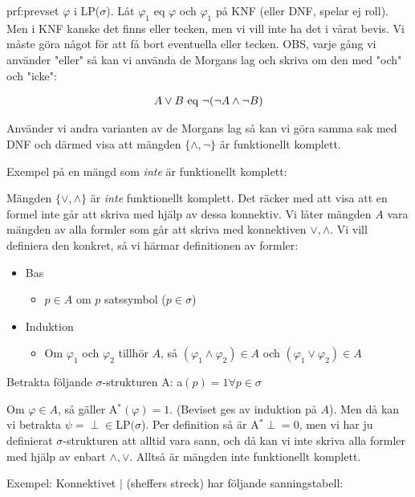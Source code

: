 \begin{prf}{prf:prevset}
  $\varphi$ i LP($\sigma$). Låt $\varphi_1$ eq $\varphi$ och $\varphi_1$ på KNF (eller DNF, spelar ej roll). Men i KNF kanske det finns eller tecken, men vi vill inte ha det i vårat bevis. Vi måste göra något för att få bort eventuella eller tecken. OBS, varje gång vi använder "eller" så kan vi använda de Morgans lag och skriva om den med "och" och "icke":
  \par

  \begin{equation*}
    \begin{gathered}
      A\vee B$ eq $\neg(\neg A\wedge\neg B)
    \end{gathered}
  \end{equation*}\par
  \noindent Använder vi andra varianten av de Morgans lag så kan vi göra samma sak med DNF och därmed visa att mängden $\{\wedge,\neg\}$ är funktionellt komplett.
\end{prf}
\par\bigskip
\noindent Exempel på en mängd som \textit{inte} är funktionellt komplett:\par
\noindent Mängden $\{\vee,\wedge\}$ är \textit{inte} funktionellt komplett. Det räcker med att visa att en formel inte går att skriva med hjälp av dessa konnektiv. Vi låter mängden $A$ vara mängden av alla formler som går att skriva med konnektiven $\vee, \wedge$. Vi vill definiera den konkret, så vi härmar definitionen av formler:
\par\bigskip
\begin{itemize}
  \item Bas
    \begin{itemize}
      \item $p\in A$ om $p$ satssymbol ($p\in\sigma$)
    \end{itemize}
  \item Induktion
    \begin{itemize}
      \item Om $\varphi_1$ och $\varphi_2$ tillhör $A$, så $(\varphi_1\wedge\varphi_2)\in A$ och $(\varphi_1\vee\varphi_2)\in A$
    \end{itemize}
\end{itemize}
\par\bigskip
\noindent Betrakta följande $\sigma$-strukturen A: a$(p)=1\forall p\in\sigma$
\par\bigskip
\noindent Om $\varphi\in A$, så gäller A$^*(\varphi)=1$. (Beviset ges av induktion på $A$). Men då kan vi betrakta $\psi =\perp\in\text{LP(}\sigma$). Per definition så är A$^*\perp=0$, men vi har ju definierat $\sigma$-strukturen att alltid vara sann, och då kan vi inte skriva alla formler med hjälp av enbart $\wedge,\vee$. Alltså är mängden inte funktionellt komplett. 
\par\bigskip
\noindent Exempel: Konnektivet $|$ (sheffers streck) har följande sanningstabell:


